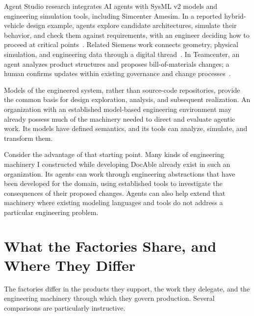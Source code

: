 Agent Studio research integrates AI agents with SysML v2 models and engineering simulation tools, including Simcenter Amesim. In a reported hybrid-vehicle design example, agents explore candidate architectures, simulate their behavior, and check them against requirements, with an engineer deciding how to proceed at critical points~\citep{liu2024agentstudio}. Related Siemens work connects geometry, physical simulation, and engineering data through a digital thread~\citep{siemens2026a3e}. In Teamcenter, an agent analyzes product structures and proposes bill-of-materials changes; a human confirms updates within existing governance and change processes~\citep{haines2026bomagent}.

Models of the engineered system, rather than source-code repositories, provide the common basis for design exploration, analysis, and subsequent realization. An organization with an established model-based engineering environment may already possess much of the machinery needed to direct and evaluate agentic work. Its models have defined semantics, and its tools can analyze, simulate, and transform them.

Consider the advantage of that starting point. Many kinds of engineering machinery I constructed while developing DocAble already exist in such an organization. Its agents can work through engineering abstractions that have been developed for the domain, using established tools to investigate the consequences of their proposed changes. Agents can also help extend that machinery where existing modeling languages and tools do not address a particular engineering problem.

\section{What the Factories Share, and Where They Differ}\label{heading:what-the-factories-share-and-where-they-differ}


The factories differ in the products they support, the work they delegate, and the engineering machinery through which they govern production. Several comparisons are particularly instructive.

